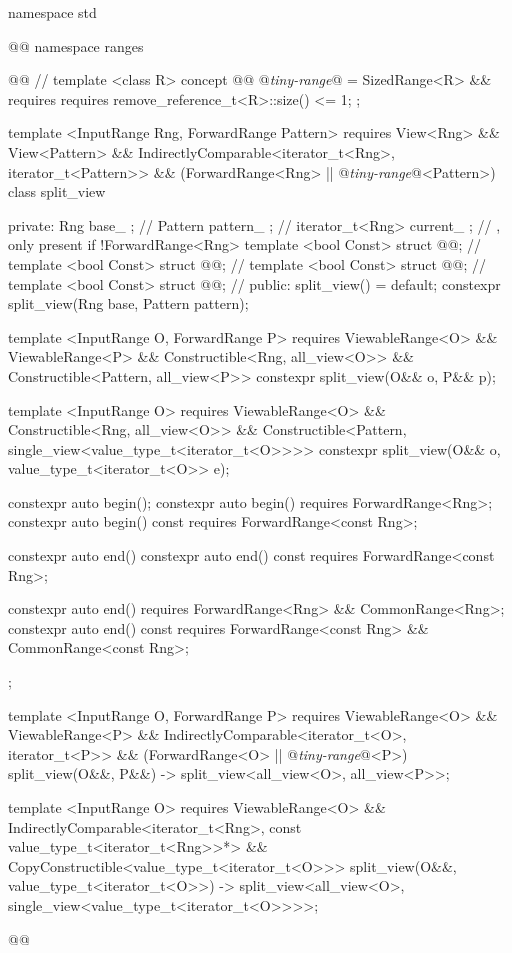 \begin{codeblock}
namespace std { @@ namespace ranges { @@
  // \expos
  template <class R>
  concept @@ @\textit{tiny-range}@ =
    SizedRange<R> && requires {
      requires remove_reference_t<R>::size() <= 1;
    };

  template <InputRange Rng, ForwardRange Pattern>
    requires View<Rng> && View<Pattern> &&
        IndirectlyComparable<iterator_t<Rng>, iterator_t<Pattern>> &&
        (ForwardRange<Rng> || @\textit{tiny-range}@<Pattern>)
  class split_view {
  private:
    Rng base_ {}; // \expos
    Pattern pattern_ {}; // \expos
    iterator_t<Rng> current_ {}; // \expos, only present if !ForwardRange<Rng>
    template <bool Const> struct @@; // \expos
    template <bool Const> struct @@; // \expos
    template <bool Const> struct @@; // \expos
    template <bool Const> struct @@; // \expos
  public:
    split_view() = default;
    constexpr split_view(Rng base, Pattern pattern);

    template <InputRange O, ForwardRange P>
      requires ViewableRange<O> && ViewableRange<P> &&
          Constructible<Rng, all_view<O>> &&
          Constructible<Pattern, all_view<P>>
    constexpr split_view(O&& o, P&& p);

    template <InputRange O>
      requires ViewableRange<O> &&
          Constructible<Rng, all_view<O>> &&
          Constructible<Pattern, single_view<value_type_t<iterator_t<O>>>>
    constexpr split_view(O&& o, value_type_t<iterator_t<O>> e);

    constexpr auto begin();
    constexpr auto begin() requires ForwardRange<Rng>;
    constexpr auto begin() const requires ForwardRange<const Rng>;

    constexpr auto end()
    constexpr auto end() const requires ForwardRange<const Rng>;

    constexpr auto end()
      requires ForwardRange<Rng> && CommonRange<Rng>;
    constexpr auto end() const
      requires ForwardRange<const Rng> && CommonRange<const Rng>;
  };

  template <InputRange O, ForwardRange P>
    requires ViewableRange<O> && ViewableRange<P> &&
      IndirectlyComparable<iterator_t<O>, iterator_t<P>> &&
      (ForwardRange<O> || @\textit{tiny-range}@<P>)
  split_view(O&&, P&&) -> split_view<all_view<O>, all_view<P>>;

  template <InputRange O>
    requires ViewableRange<O> &&
      IndirectlyComparable<iterator_t<Rng>, const value_type_t<iterator_t<Rng>>*> &&
      CopyConstructible<value_type_t<iterator_t<O>>>
  split_view(O&&, value_type_t<iterator_t<O>>)
    -> split_view<all_view<O>, single_view<value_type_t<iterator_t<O>>>>;
}}@\removed{\}\}}@
\end{codeblock}

